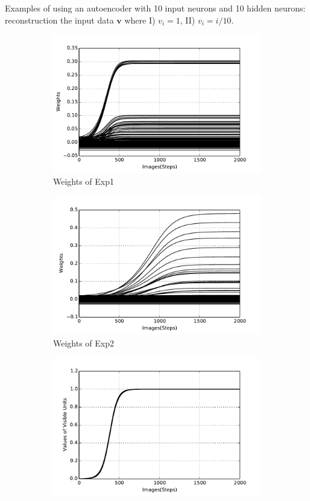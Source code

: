 	Examples of using an autoencoder with 10 input neurons and 10 hidden neurons: reconstruction the input data $\mathbf{v}$ where I) $v_i = 1$, II) $v_i = i/10$.
	\begin{figure}
		\centering
		\begin{subfigure}[t]{0.4\textwidth}
			\includegraphics[width=\textwidth]{pics_ae/exp1_weights_non.pdf}
			\caption{Weights of Exp1}
		\end{subfigure}
		\begin{subfigure}[t]{0.4\textwidth}
			\includegraphics[width=\textwidth]{pics_ae/exp2_weights_non.pdf}
			\caption{Weights of Exp2}
		\end{subfigure}
		\begin{subfigure}[t]{0.4\textwidth}
			\includegraphics[width=\textwidth]{pics_ae/exp1_recon_non.pdf}

\end{subfigure}
\end{figure}
